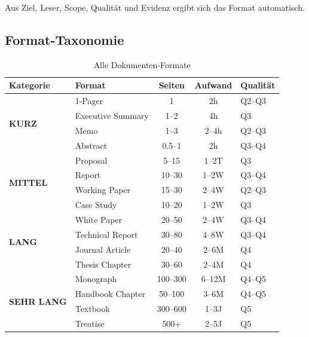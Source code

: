 \documentclass[12pt,a4paper]{article}
\begin{document}
\begin{tcolorbox}[colback=gray!5!white, colframe=gray!75!black,
    title=\textbf{Schritt 2: Leite das Format aus den Dimensionen ab}]

Aus Ziel, Leser, Scope, Qualität und Evidenz ergibt sich das Format automatisch.

\end{tcolorbox}

\subsection{Format-Taxonomie}

\begin{table}[htbp]
\centering
\caption{Alle Dokumenten-Formate}
\renewcommand{\arraystretch}{1.3}
\begin{tabular}{@{}llccl@{}}
\toprule
\textbf{Kategorie} & \textbf{Format} & \textbf{Seiten} & \textbf{Aufwand} & \textbf{Qualität} \\
\midrule
\multirow{4}{*}{\textbf{KURZ}} 
& 1-Pager & 1 & 2h & Q2--Q3 \\
& Executive Summary & 1--2 & 4h & Q3 \\
& Memo & 1--3 & 2--4h & Q2--Q3 \\
& Abstract & 0.5--1 & 2h & Q3--Q4 \\
\midrule
\multirow{4}{*}{\textbf{MITTEL}} 
& Proposal & 5--15 & 1--2T & Q3 \\
& Report & 10--30 & 1--2W & Q3--Q4 \\
& Working Paper & 15--30 & 2--4W & Q2--Q3 \\
& Case Study & 10--20 & 1--2W & Q3 \\
\midrule
\multirow{4}{*}{\textbf{LANG}} 
& White Paper & 20--50 & 2--4W & Q3--Q4 \\
& Technical Report & 30--80 & 4--8W & Q3--Q4 \\
& Journal Article & 20--40 & 2--6M & Q4 \\
& Thesis Chapter & 30--60 & 2--4M & Q4 \\
\midrule
\multirow{4}{*}{\textbf{SEHR LANG}} 
& Monograph & 100--300 & 6--12M & Q4--Q5 \\
& Handbook Chapter & 50--100 & 3--6M & Q4--Q5 \\
& Textbook & 300--600 & 1--3J & Q5 \\
& Treatise & 500+ & 2--5J & Q5 \\
\bottomrule
\end{tabular}
\end{table}
\end{document}
